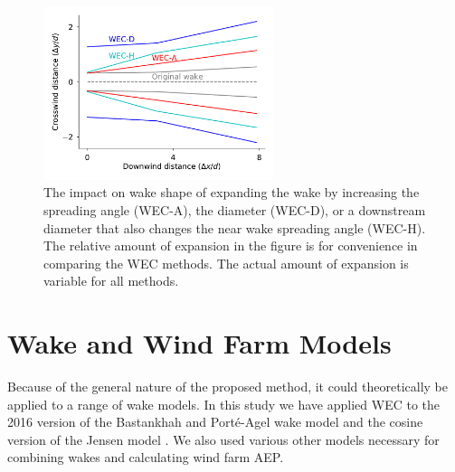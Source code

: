 \documentclass[a4paper]{jpconf}
\begin{document}
\begin{figure}[h]
	\centering
	\includegraphics[width=0.6\textwidth,trim={0, 0, 0, 2.0}]{wec-methods}
	\caption{The impact on wake shape of expanding the wake by increasing the spreading angle (WEC-A), the diameter (WEC-D), or a downstream diameter that also changes the near wake spreading angle (WEC-H). The relative amount of expansion in the figure is for convenience in comparing the WEC methods. The actual amount of expansion is variable for all methods.}
	\label{fig:wec-methods}
\end{figure}

\section{Wake and Wind Farm Models}
Because of the general nature of the proposed method, it could theoretically be applied to a range of wake models. In this study we have applied WEC to the 2016 version of the Bastankhah and Port\'e-Agel wake model \cite{bastankhah2016} and the cosine version of the Jensen model \cite{jensen1983}. We also used various other models necessary for combining wakes and calculating wind farm AEP.
\end{document}
